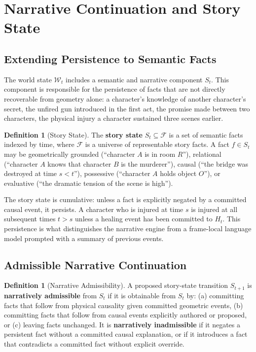 \documentclass[11pt,a4paper]{article}
\theoremstyle{plain}
\theoremstyle{definition}
\newtheorem{definition}[theorem]{Definition}
\theoremstyle{remark}
\begin{document}
\section{Narrative Continuation and Story State}
\label{sec:narrative}

\subsection{Extending Persistence to Semantic Facts}

The world state $\mathcal{W}_t$ includes a semantic and narrative component $S_t$. This component is responsible for the persistence of facts that are not directly recoverable from geometry alone: a character's knowledge of another character's secret, the unfired gun introduced in the first act, the promise made between two characters, the physical injury a character sustained three scenes earlier.

\begin{definition}[Story State]
The \textbf{story state} $S_t \subseteq \mathcal{F}$ is a set of semantic facts indexed by time, where $\mathcal{F}$ is a universe of representable story facts. A fact $f \in S_t$ may be geometrically grounded (``character $A$ is in room $R$''), relational (``character $A$ knows that character $B$ is the murderer''), causal (``the bridge was destroyed at time $s < t$''), possessive (``character $A$ holds object $O$''), or evaluative (``the dramatic tension of the scene is high'').
\end{definition}

The story state is cumulative: unless a fact is explicitly negated by a committed causal event, it persists. A character who is injured at time $s$ is injured at all subsequent times $t > s$ unless a healing event has been committed to $H_t$. This persistence is what distinguishes the narrative engine from a frame-local language model prompted with a summary of previous events.

\subsection{Admissible Narrative Continuation}

\begin{definition}[Narrative Admissibility]
A proposed story-state transition $S_{t+1}$ is \textbf{narratively admissible} from $S_t$ if it is obtainable from $S_t$ by: (a) committing facts that follow from physical causality given committed geometric events, (b) committing facts that follow from causal events explicitly authored or proposed, or (c) leaving facts unchanged. It is \textbf{narratively inadmissible} if it negates a persistent fact without a committed causal explanation, or if it introduces a fact that contradicts a committed fact without explicit override.
\end{definition}
\end{document}
